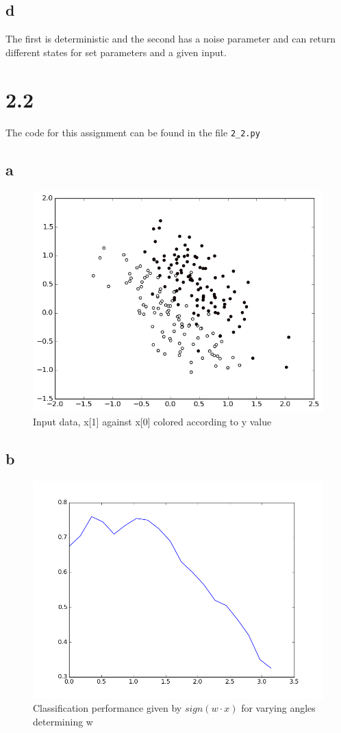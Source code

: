 \documentclass[11pt,a4paper]{article}
\begin{document}
\subsection*{d}
The first is deterministic and the second has a noise parameter and can return different states for set parameters and a given
input.
\section*{2.2}
The code for this assignment can be found in the file \verb|2_2.py|
\subsection*{a}
\begin{figure}[h]
  \centering
  \includegraphics[width=\textwidth]{Input data with classification.png}
  \caption{Input data, x[1] against x[0] colored according to y value}
\end{figure}
\subsection*{b}
\begin{figure}[h]
  \centering
  \includegraphics[width=\textwidth]{Classification performance for various w-angles.png}
  \caption{Classification performance given by $sign(w \cdot x)$ for varying angles determining w}
\end{figure}
\newpage
\end{document}
